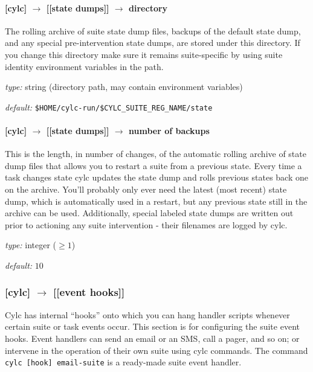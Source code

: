 \paragraph[directory]{[cylc] $\rightarrow$ [[state dumps]] $\rightarrow$ directory}

 The rolling archive of suite state dump files, backups of the default 
 state dump, and any special pre-intervention state dumps, are stored
 under this directory.  If you change this directory make sure it
 remains suite-specific by using suite identity environment variables in
 the path.

\begin{myitemize}
    \item {\em type:} string (directory path, may contain environment variables)
    \item {\em default:} \lstinline=$HOME/cylc-run/$CYLC_SUITE_REG_NAME/state=
\end{myitemize}

\paragraph[number of backups]{[cylc] $\rightarrow$ [[state dumps]] $\rightarrow$ number of backups}

This is the length, in number of changes, of the automatic rolling
archive of state dump files that allows you to restart a suite from a
previous state.  Every time a task changes state cylc updates the state
dump and rolls previous states back one on the archive.  You'll probably
only ever need the latest (most recent) state dump, which is
automatically used in a restart, but any previous state still in the
archive can be used.  Additionally, special labeled state dumps are
written out prior to actioning any suite intervention - their filenames
are logged by cylc.

\begin{myitemize}
    \item {\em type:} integer ($\geq 1$)
    \item {\em default:} $10$
\end{myitemize}

\subsubsection[{[[}event hooks{]]}]{[cylc] $\rightarrow$ [[event hooks]]}
\label{SuiteEventHandling}

Cylc has internal ``hooks'' onto which you can hang handler scripts
whenever certain suite or task events occur. This section is for
configuring the suite event hooks. Event handlers can send an email or
an SMS, call a pager, and so on; or intervene in the operation of their
own suite using cylc commands. 
The command \lstinline=cylc [hook] email-suite= is a ready-made suite
event handler.

